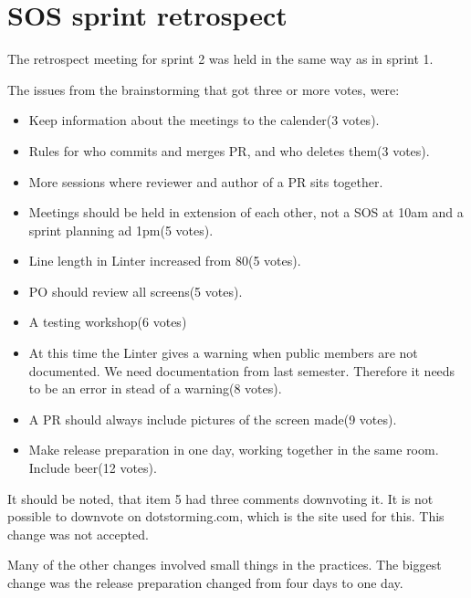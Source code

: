 \section{SOS sprint retrospect}

The retrospect meeting for sprint 2 was held in the same way as in sprint 1.

The issues from the brainstorming that got three or more votes, were:
\begin{itemize}
    \item Keep information about the meetings to the calender(3 votes).
    \item Rules for who commits and merges \gls{PR}, and who deletes them(3 votes).
    \item More sessions where reviewer and author of a \gls{PR} sits together. 
    \item Meetings should be held in extension of each other, not a SOS at 10am and a sprint planning ad 1pm(5 votes).  
    \item Line length in Linter increased from 80(5 votes).    
    \item PO should review all screens(5 votes).
    \item A testing workshop(6 votes)
    \item At this time the Linter gives a warning when public members are not documented. We need documentation from last semester. Therefore it needs to be an error in stead of a warning(8 votes).
    \item A \gls{PR} should always include pictures of the screen made(9 votes).
    \item Make release preparation in one day, working together in the same room. Include beer(12 votes).
\end{itemize}

It should be noted, that item 5 had three comments downvoting it. It is not possible to downvote on dotstorming.com, which is the site used for this. This change was not accepted.

Many of the other changes involved small things in the practices. The biggest change was the release preparation changed from four days to one day.
